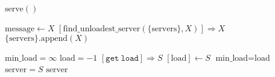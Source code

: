 \documentclass{article}
\begin{document}
\pagestyle{empty}

\newcommand{\send}{\Rightarrow}
\newcommand{\sendto}{\rightarrow}
\algrenewcommand\textproc{\textrm}

\begin{algorithmic}
  
  \algrenewcommand{}
  
  
  \State $\text{serve}()$
  \EndFunction

  \algrenewcommand{}

  \State $\text{message} \gets X$
  \State $[\text{find\_unloadest\_server}(\{\text{servers}\},X)] \send X$
  \Else
  \State $\{\text{servers}\}.\text{append}(X)$
  \EndIf
  \EndIf
  \EndWhile
  \EndProcedure

  \State $\text{min\_load}=\infty$
  \State $\text{load} = -1$
  \Else
  \State $[\mathtt{get~load}] \send S$
  \State $[\text{load}] \gets S$
  \EndIf
  \State $\text{min\_load}=\text{load}$
  \State $\text{server}=S$
  \EndIf
  \EndFor
  \State \Return $\text{server}$
  \EndFunction

  \EndProcedure
\end{algorithmic}
\end{document}
